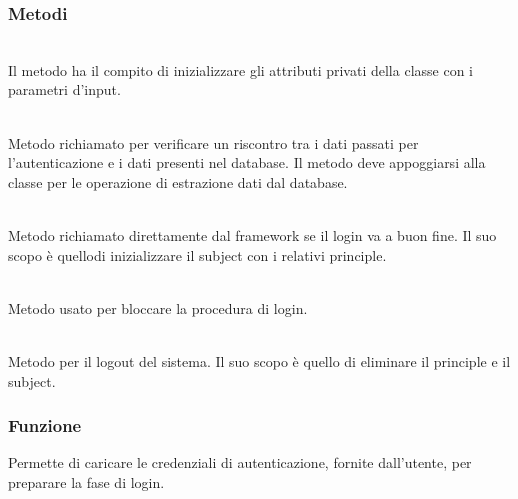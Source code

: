 \subsubsection*{Metodi}
\begin{description}
	\item{}\\
	Il metodo ha il compito di inizializzare gli attributi privati della classe con i parametri d'input.

	\item{}\\
	Metodo richiamato per verificare un riscontro tra i dati passati per l'autenticazione e i dati presenti nel database. Il metodo deve appoggiarsi alla classe  per le operazione di estrazione dati dal database.
	
	\item{}\\
	Metodo richiamato direttamente dal framework se il login va a buon fine. Il suo scopo è quellodi inizializzare il subject con i relativi principle.
	
	\item{}\\
	Metodo usato per bloccare la procedura di login.
	
	\item{}\\
	Metodo per il logout del sistema. Il suo scopo è quello di eliminare il principle e il subject.

\end{description}


\subsubsection*{Funzione}
Permette di caricare le credenziali di autenticazione, fornite dall'utente, per preparare la fase di login.

